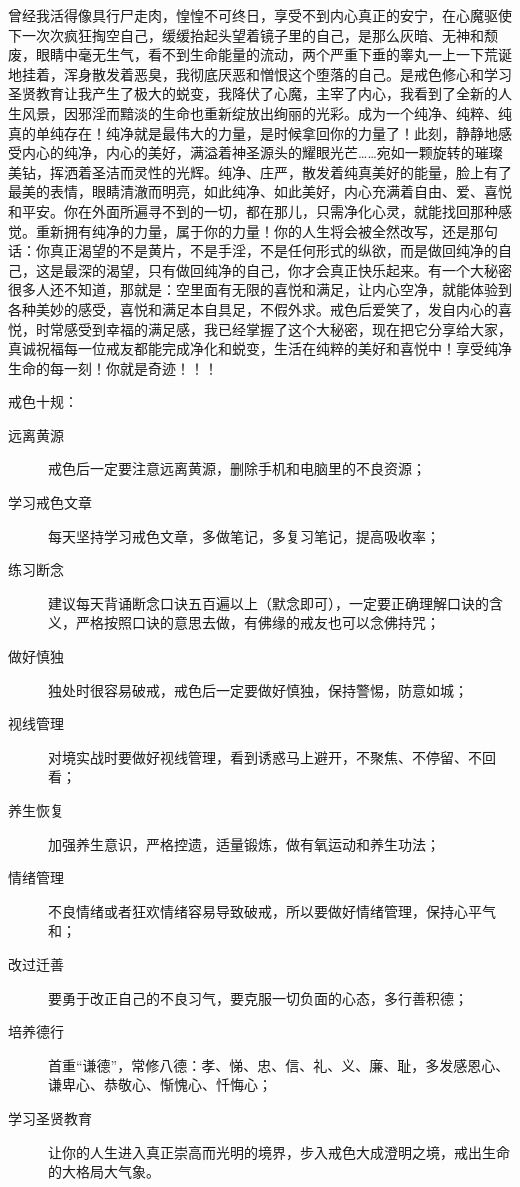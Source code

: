 曾经我活得像具行尸走肉，惶惶不可终日，享受不到内心真正的安宁，在心魔驱使下一次次疯狂掏空自己，缓缓抬起头望着镜子里的自己，是那么灰暗、无神和颓废，眼睛中毫无生气，看不到生命能量的流动，两个严重下垂的睾丸一上一下荒诞地挂着，浑身散发着恶臭，我彻底厌恶和憎恨这个堕落的自己。是戒色修心和学习圣贤教育让我产生了极大的蜕变，我降伏了心魔，主宰了内心，我看到了全新的人生风景，因邪淫而黯淡的生命也重新绽放出绚丽的光彩。成为一个纯净、纯粹、纯真的单纯存在！纯净就是最伟大的力量，是时候拿回你的力量了！此刻，静静地感受内心的纯净，内心的美好，满溢着神圣源头的耀眼光芒……宛如一颗旋转的璀璨美钻，挥洒着圣洁而灵性的光辉。纯净、庄严，散发着纯真美好的能量，脸上有了最美的表情，眼睛清澈而明亮，如此纯净、如此美好，内心充满着自由、爱、喜悦和平安。你在外面所遍寻不到的一切，都在那儿，只需净化心灵，就能找回那种感觉。重新拥有纯净的力量，属于你的力量！你的人生将会被全然改写，还是那句话：你真正渴望的不是黄片，不是手淫，不是任何形式的纵欲，而是做回纯净的自己，这是最深的渴望，只有做回纯净的自己，你才会真正快乐起来。有一个大秘密很多人还不知道，那就是：空里面有无限的喜悦和满足，让内心空净，就能体验到各种美妙的感受，喜悦和满足本自具足，不假外求。戒色后爱笑了，发自内心的喜悦，时常感受到幸福的满足感，我已经掌握了这个大秘密，现在把它分享给大家，真诚祝福每一位戒友都能完成净化和蜕变，生活在纯粹的美好和喜悦中！享受纯净生命的每一刻！你就是奇迹！！！

戒色十规：

\begin{description}
    \item[远离黄源] 戒色后一定要注意远离黄源，删除手机和电脑里的不良资源；
    \item[学习戒色文章] 每天坚持学习戒色文章，多做笔记，多复习笔记，提高吸收率；
    \item[练习断念] 建议每天背诵断念口诀五百遍以上（默念即可），一定要正确理解口诀的含义，严格按照口诀的意思去做，有佛缘的戒友也可以念佛持咒；
    \item[做好慎独] 独处时很容易破戒，戒色后一定要做好慎独，保持警惕，防意如城；
    \item[视线管理] 对境实战时要做好视线管理，看到诱惑马上避开，不聚焦、不停留、不回看；
    \item[养生恢复] 加强养生意识，严格控遗，适量锻炼，做有氧运动和养生功法；
    \item[情绪管理] 不良情绪或者狂欢情绪容易导致破戒，所以要做好情绪管理，保持心平气和；
    \item[改过迁善] 要勇于改正自己的不良习气，要克服一切负面的心态，多行善积德；
    \item[培养德行] 首重“谦德”，常修八德：孝、悌、忠、信、礼、义、廉、耻，多发感恩心、谦卑心、恭敬心、惭愧心、忏悔心；
    \item[学习圣贤教育] 让你的人生进入真正崇高而光明的境界，步入戒色大成澄明之境，戒出生命的大格局大气象。
\end{description}

